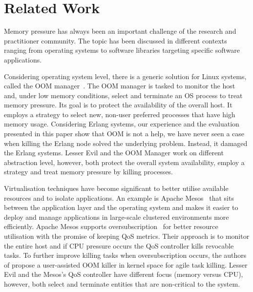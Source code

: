 \documentclass{llncs}
\begin{document}
\section{Related Work}
Memory pressure has always been an important challenge of the research and practitioner community. The topic has been discussed in different contexts ranging from operating systems to software libraries targeting specific software applications.

Considering operating system level, there is a generic solution for Linux systems, called the OOM manager~\cite{oom}.  The OOM manager is tasked to monitor the host and, under low memory conditions, select and terminate an OS process to treat memory pressure. Its goal is to protect the availability of the overall host. It employs a strategy to select new, non-user preferred processes that have high memory usage. Considering Erlang systems, our experience and the evaluation presented in this paper show that OOM is not a help, we have never seen a case when killing the Erlang node solved the underlying problem. Instead, it damaged the Erlang systems. Lesser Evil and the OOM Manager work on different abstraction level, however, both protect the overall system availability, employ a strategy and treat memory pressure by killing processes.

Virtualisation techniques have become significant to better utilise available resources and to isolate applications. An example is Apache Mesos~\cite{embracingfailures,mesos2} that sits between the application layer and the operating system and makes it easier to deploy and manage applications in large-scale clustered environments more efficiently. Apache Mesos supports oversubscription~\cite{mesos-oversub} for better resource utilisation with the promise of keeping QoS metrics. Their approach is to monitor the entire host and if CPU pressure occurs the QoS controller kills revocable tasks. To further improve killing tasks when oversubscription occurs, the authors of \cite{UAkiller} propose a user-assisted OOM killer in kernel space for agile task killing. Lesser Evil and the Mesos's QoS controller have different focus (memory versus CPU), however, both select and terminate entities that are non-critical to the system. 
\end{document}
